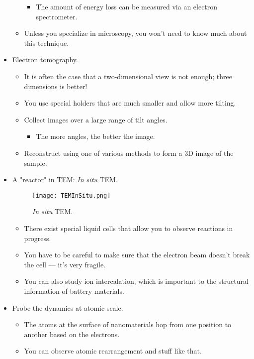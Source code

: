 \documentclass[../notes.tex]{subfiles}
\begin{document}
\begin{itemize}
\begin{itemize}
\begin{itemize}
            \item The amount of energy loss can be measured via an electron spectrometer.
        \end{itemize}
        \item Unless you specialize in microscopy, you won't need to know much about this technique.
    \end{itemize}
    \item Electron tomography.
    \begin{itemize}
        \item It is often the case that a two-dimensional view is not enough; three dimensions is better!
        \item You use special holders that are much smaller and allow more tilting.
        \item Collect images over a large range of tilt angles.
        \begin{itemize}
            \item The more angles, the better the image.
        \end{itemize}
        \item Reconstruct using one of various methods to form a 3D image of the sample.
    \end{itemize}
    \item A "reactor" in TEM: \emph{In situ} TEM.
    \begin{figure}[h!]
        \centering
        \texttt{[image: TEMInSitu.png]}
        \caption{\emph{In situ} TEM.}
        \label{fig:TEMInSitu}
    \end{figure}
    \begin{itemize}
        \item There exist special liquid cells that allow you to observe reactions in progress.
        \item You have to be careful to make sure that the electron beam doesn't break the cell --- it's very fragile.
        \item You can also study ion intercalation, which is important to the structural information of battery materials.
    \end{itemize}
    \item Probe the dynamics at atomic scale.
    \begin{itemize}
        \item The atoms at the surface of nanomaterials hop from one position to another based on the electrons.
        \item You can observe atomic rearrangement and stuff like that.

\end{itemize}
\end{itemize}
\end{document}
